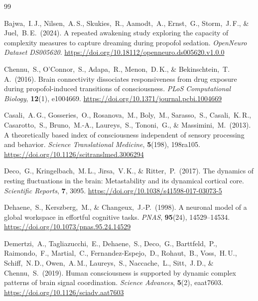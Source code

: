 \documentclass[11pt,a4paper]{article}
\theoremstyle{plain}
\theoremstyle{definition}
\theoremstyle{remark}
\begin{document}
\newpage
\begin{thebibliography}{99}

Bajwa,~I.\,J., Nilsen,~A.\,S., Skukies,~R., Aamodt,~A., Ernst,~G., Storm,~J.\,F., \& Juel,~B.\,E.\ (2024).
A repeated awakening study exploring the capacity of complexity measures to capture dreaming during propofol sedation.
\textit{OpenNeuro Dataset DS005620}.
\url{https://doi.org/10.18112/openneuro.ds005620.v1.0.0}


Chennu,~S., O'Connor,~S., Adapa,~R., Menon,~D.\,K., \& Bekinschtein,~T.\,A.\ (2016).
Brain connectivity dissociates responsiveness from drug exposure during propofol-induced transitions of consciousness.
\textit{PLoS Computational Biology}, \textbf{12}(1), e1004669.
\url{https://doi.org/10.1371/journal.pcbi.1004669}

Casali,~A.\,G., Gosseries,~O., Rosanova,~M., Boly,~M., Sarasso,~S., Casali,~K.\,R., Casarotto,~S., Bruno,~M.-A., Laureys,~S., Tononi,~G., \& Massimini,~M.\ (2013).
A theoretically based index of consciousness independent of sensory processing and behavior.
\textit{Science Translational Medicine}, \textbf{5}(198), 198ra105.
\url{https://doi.org/10.1126/scitranslmed.3006294}

Deco,~G., Kringelbach,~M.\,L., Jirsa,~V.\,K., \& Ritter,~P.\ (2017).
The dynamics of resting fluctuations in the brain: Metastability and its dynamical cortical core.
\textit{Scientific Reports}, \textbf{7}, 3095.
\url{https://doi.org/10.1038/s41598-017-03073-5}

Dehaene,~S., Kerszberg,~M., \& Changeux,~J.-P.\ (1998).
A neuronal model of a global workspace in effortful cognitive tasks.
\textit{PNAS}, \textbf{95}(24), 14529--14534.
\url{https://doi.org/10.1073/pnas.95.24.14529}

Demertzi,~A., Tagliazucchi,~E., Dehaene,~S., Deco,~G., Barttfeld,~P., Raimondo,~F., Martial,~C., Fernandez-Espejo,~D., Rohaut,~B., Voss,~H.\,U., Schiff,~N.\,D., Owen,~A.\,M., Laureys,~S., Naccache,~L., Sitt,~J.\,D., \& Chennu,~S.\ (2019).
Human consciousness is supported by dynamic complex patterns of brain signal coordination.
\textit{Science Advances}, \textbf{5}(2), eaat7603.
\url{https://doi.org/10.1126/sciadv.aat7603}


\end{thebibliography}
\end{document}
